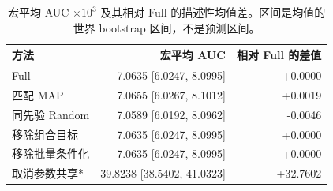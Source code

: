 \begin{table}[tbp]
\centering
\caption{宏平均 AUC $\times10^3$ 及其相对 Full 的描述性均值差。区间是均值的世界 bootstrap 区间，不是预测区间。}
\label{tab:macro}
\scriptsize
\setlength{\tabcolsep}{3pt}
\begin{tabular}{lrr}
\toprule
方法 & 宏平均 AUC & 相对 Full 的差值 \\
\midrule
Full & 7.0635 [6.0247, 8.0995] & +0.0000 \\
匹配 MAP & 7.0655 [6.0267, 8.1012] & +0.0019 \\
同先验 Random & 7.0589 [6.0192, 8.0962] & -0.0046 \\
移除组合目标 & 7.0635 [6.0247, 8.0995] & +0.0000 \\
移除批量条件化 & 7.0635 [6.0247, 8.0995] & +0.0000 \\
取消参数共享* & 39.8238 [38.5402, 41.0323] & +32.7602 \\
\bottomrule
\end{tabular}
\end{table}
